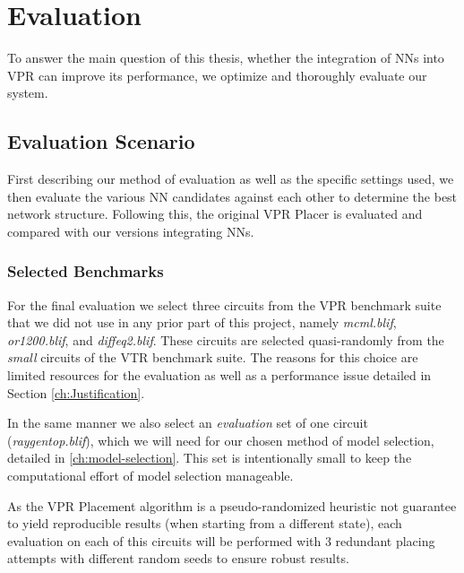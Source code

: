 
\chapter{Evaluation}\label{ch:evaluation}
\glsresetall %

To answer the main question of this thesis, whether the integration of \glspl{NN} into \gls{VPR} can improve its performance, we optimize and thoroughly evaluate our system.

\section{Evaluation Scenario}

First describing our method of evaluation as well as the specific settings used, we then evaluate the various \gls{NN} candidates against each other to determine the best network structure. Following this, the original \gls{VPR} Placer is evaluated and compared with our versions integrating \glspl{NN}.

\subsection{Selected Benchmarks}\label{ch:benchmarks}

For the final evaluation we select three circuits from the \gls{VPR} benchmark suite that we did not use in any prior part of this project, namely \textit{mcml.blif}, \textit{or1200.blif}, and \textit{diffeq2.blif}. These circuits are selected quasi-randomly from the \textit{small} circuits of the \gls{VTR} benchmark suite. The reasons for this choice are limited resources for the evaluation as well as a performance issue detailed in Section \ref{ch:Justification}.

In the same manner we also select an \textit{evaluation} set of one circuit (\textit{raygentop.blif}), which we will need for our chosen method of model selection, detailed in \ref{ch:model-selection}. This set is intentionally small to keep the computational effort of model selection manageable.

As the \gls{VPR} Placement algorithm is a pseudo-randomized heuristic not guarantee to yield reproducible results (when starting from a different state), each evaluation on each of this circuits will be performed with 3 redundant placing attempts with different random seeds to ensure robust results. 

